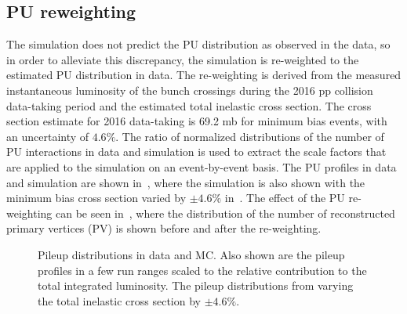 \subsection{PU reweighting}
\label{subsec:pu}
The simulation does not predict the PU distribution as observed in the data, so in order to alleviate this discrepancy, the simulation is re-weighted to the estimated PU distribution in data. The re-weighting is derived from the measured instantaneous luminosity of the bunch crossings during the 2016 pp collision data-taking period and the estimated total inelastic cross section. The cross section estimate for 2016 data-taking is 69.2 mb for minimum bias events, with an uncertainty of $4.6\%$. The ratio of normalized distributions of the number of PU interactions in data and \ttll simulation is used to extract the scale factors that are applied to the simulation on an event-by-event basis. The PU profiles in data and simulation are shown in~, where the simulation is also shown with the minimum bias cross section varied by $\pm4.6\%$ in~. The effect of the PU re-weighting can be seen in~, where the distribution of the number of reconstructed primary vertices (PV) is shown before and after the re-weighting.

\begin{figure}
  \caption{\protect{} Pileup distributions in data and MC. Also shown are the pileup profiles in a few run ranges scaled to the relative contribution to the total integrated luminosity.\protect{} The pileup distributions from varying the total inelastic cross section by $\pm4.6\%$.}
  \label{fig:pu}
\end{figure}

